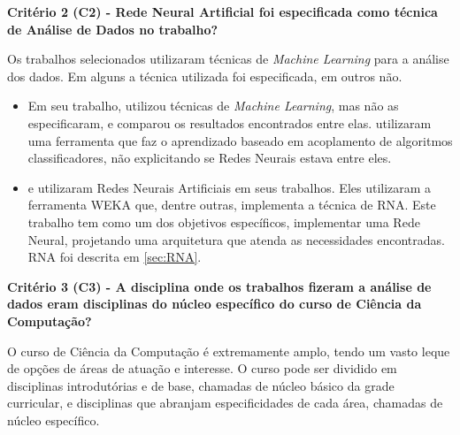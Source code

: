 \textbf{Critério 2 (C2) - Rede Neural Artificial foi especificada como técnica de Análise de Dados no trabalho?}

Os trabalhos selecionados utilizaram técnicas de \textit{Machine Learning} para a análise dos dados. Em alguns a técnica utilizada foi especificada, em outros não.

\begin{itemize}
    \item Em seu trabalho,  utilizou técnicas de \textit{Machine Learning}, mas não as especificaram, e comparou os resultados encontrados entre elas. %
     utilizaram uma ferramenta que faz o aprendizado baseado em acoplamento de algoritmos classificadores, não explicitando se Redes Neurais estava entre eles.
    \item {} e  utilizaram Redes Neurais Artificiais em seus trabalhos. Eles utilizaram a ferramenta WEKA que, dentre outras, implementa a técnica de RNA. Este trabalho tem como um dos objetivos específicos, implementar uma Rede Neural, projetando uma arquitetura que atenda as necessidades encontradas. RNA foi descrita em \autoref{sec:RNA}.
\end{itemize}

\textbf{Critério 3 (C3) - A disciplina onde os trabalhos fizeram a análise de dados eram disciplinas do núcleo específico do curso de Ciência da Computação?}

O curso de Ciência da Computação é extremamente amplo, tendo um vasto leque de opções de áreas de atuação e interesse. O curso pode ser dividido em disciplinas introdutórias e de base, chamadas de núcleo básico da grade curricular, e disciplinas que abranjam especificidades de cada área, chamadas de núcleo específico.

